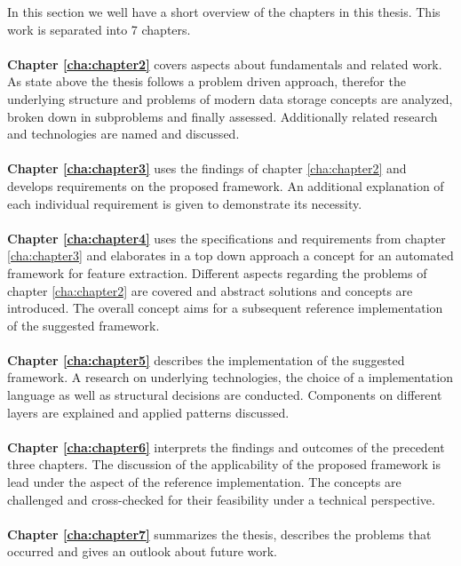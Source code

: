 In this section we well have a short overview of the chapters in this thesis. This work is separated into 7 chapters.
\\\\
\textbf{Chapter \ref{cha:chapter2}} covers aspects about fundamentals and related work. As state above the thesis follows a problem driven approach, therefor the underlying structure and problems of modern data storage concepts are analyzed, broken down in subproblems and finally assessed. Additionally related research and technologies are named and discussed.
\\\\
\textbf{Chapter \ref{cha:chapter3}} uses the findings of chapter \ref{cha:chapter2} and develops requirements on the proposed framework. An additional explanation of each individual requirement is given to demonstrate its necessity.
\\\\
\textbf{Chapter \ref{cha:chapter4}} uses the specifications and requirements from chapter \ref{cha:chapter3} and elaborates in a top down approach a concept for an automated framework for feature extraction. Different aspects regarding the problems of chapter \ref{cha:chapter2} are covered and abstract solutions and concepts are introduced. The overall concept aims for a subsequent reference implementation of the suggested framework.
\\\\
\textbf{Chapter \ref{cha:chapter5}} describes the implementation of the suggested framework. A research on underlying technologies, the choice of a implementation language as well as structural decisions are conducted. Components on different layers are explained and applied patterns discussed. 
\\\\
\textbf{Chapter \ref{cha:chapter6}} interprets the findings and outcomes of the precedent three chapters. The discussion of the applicability of the proposed framework is lead under the aspect of the reference implementation. The concepts are challenged and cross-checked for their feasibility under a technical perspective.
\\\\
\textbf{Chapter \ref{cha:chapter7}} summarizes the thesis, describes the problems that occurred and gives an outlook about future work.